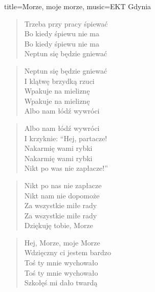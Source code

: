 \begin{song}{title={Morze, moje morze}, music={EKT Gdynia}}
\begin{multicols}{2}
\begin{verse}
        Trzeba przy pracy śpiewać \\
        Bo kiedy śpiewu nie ma \\
        Bo kiedy śpiewu nie ma \\
        Neptun się będzie gniewać
    \end{verse}
    \begin{verse}
        Neptun się będzie gniewać \\
        I klątwę brzydką rzuci \\
        Wpakuje na mieliznę \\
        Wpakuje na mieliznę \\
        Albo nam łódź wywróci
    \end{verse}
    \begin{verse}
        Albo nam łódź wywróci \\
        I krzyknie: ``Hej, partacze! \\
        Nakarmię wami rybki \\
        Nakarmię wami rybki \\
        Nikt po was nie zapłacze!''
    \end{verse}
    \begin{verse}
        Nikt po nas nie zapłacze \\
        Nikt nam nie dopomoże \\
        Za wszystkie miłe rady \\
        Za wszystkie miłe rady \\
        Dziękuję tobie, Morze
    \end{verse}
    \begin{verse}
        Hej, Morze, moje Morze \\
        Wdzięczny ci jestem bardzo \\
        Toś ty mnie wychowało \\
        Toś ty mnie wychowało \\
        Szkołęś mi dało twardą
    \end{verse}
    \end{multicols}
\end{song}

